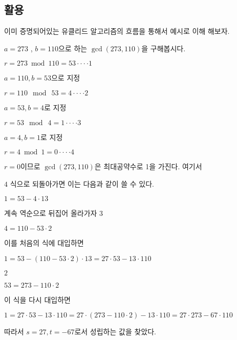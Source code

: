 \documentclass{oblivoir}
\begin{document}
\subsection{활용}
이미 증명되어있는 유클리드 알고리즘의 흐름을 통해서 예시로 이해 해보자.\par
$a=273$  , $b=110$으로 하는 $\gcd(273,110)$을 구해봅시다.
\begin{center}
    $r= 273\bmod  110 = 53 \cdot\cdot\cdot\cdot \mathit{1}$
\end{center}
$a=110 , b=53$으로 지정
\begin{center}
    $r= 110\:\bmod \: 53 = 4\cdot\cdot\cdot\cdot \mathit{2}$
\end{center}
$a=53 , b=4$로 지정
\begin{center}
    $r= 53\:\bmod \: 4 = 1 \cdot\cdot\cdot\cdot \mathit{3}$
\end{center}
$a=4 , b=1$로 지정
\begin{center}
    $r= 4\bmod  1 = 0\cdot\cdot\cdot\cdot \mathit{4}$
\end{center}
$r=0$이므로 $\gcd(273,110)$은 최대공약수로 1을 가진다.
여기서 

$\mathit{4}$ 식으로 되돌아가면 이는 다음과 같이 쓸 수 있다.
\begin{center}
    $1=53 - 4\cdot13$
\end{center}
계속 역순으로 뒤집어 올라가자 $\mathit{3}$
\begin{center}
    $4=110 - 53\cdot2$
\end{center}
이를 처음의 식에 대입하면
\begin{center}
    $1=53 - (110 - 53\cdot2)\cdot13 =27\cdot53-13\cdot110 $
\end{center}
$\mathit{2}$
\begin{center}
    $53=273 - 110\cdot2$
\end{center}
이 식을 다시 대입하면
\begin{center}
    $1=27\cdot53-13\cdot110=27\cdot(273 - 110\cdot2)-13\cdot110=27\cdot273-67\cdot 110$
\end{center}
따라서 $s=27, t=-67$로서 성립하는 값을 찾았다.
\end{document}

